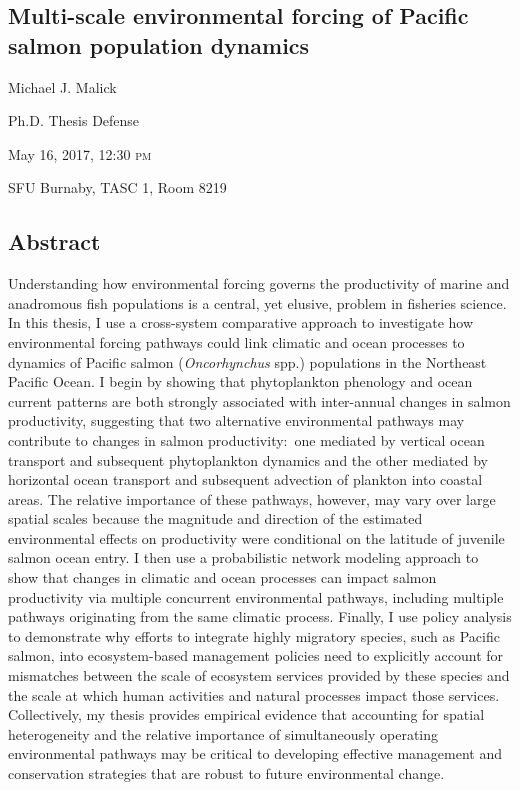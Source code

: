 \documentclass[11pt]{report}
\begin{document}

\begin{center}
  \section*{Multi-scale environmental forcing of Pacific salmon population
               dynamics}

  Michael J. Malick

  Ph.D. Thesis Defense

  May 16, 2017, 12:30 \textsc{pm}

  SFU Burnaby, TASC 1, Room 8219

\end{center}

\subsection*{Abstract}

Understanding how environmental forcing governs the productivity of marine and
anadromous fish populations is a central, yet elusive, problem in fisheries
science. In this thesis, I use a cross-system comparative approach to
investigate how environmental forcing pathways could link climatic and ocean
processes to dynamics of Pacific salmon (\textit{Oncorhynchus} spp.) populations
in the Northeast Pacific Ocean. I begin by showing that phytoplankton phenology
and ocean current patterns are both strongly associated with inter-annual
changes in salmon productivity, suggesting that two alternative environmental
pathways may contribute to changes in salmon productivity:~one mediated by
vertical ocean transport and subsequent phytoplankton dynamics and the other
mediated by horizontal ocean transport and subsequent advection of plankton into
coastal areas. The relative importance of these pathways, however, may vary over
large spatial scales because the magnitude and direction of the estimated
environmental effects on productivity were conditional on the latitude of
juvenile salmon ocean entry. I then use a probabilistic network modeling
approach to show that changes in climatic and ocean processes can impact salmon
productivity via multiple concurrent environmental pathways, including multiple
pathways originating from the same climatic process. Finally, I use policy
analysis to demonstrate why efforts to integrate highly migratory species, such
as Pacific salmon, into ecosystem-based management policies need to explicitly
account for mismatches between the scale of ecosystem services provided by these
species and the scale at which human activities and natural processes impact
those services. Collectively, my thesis provides empirical evidence that
accounting for spatial heterogeneity and the relative importance of
simultaneously operating environmental pathways may be critical to developing
effective management and conservation strategies that are robust to future
environmental change.
\end{document}
